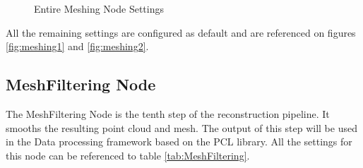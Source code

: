 \documentclass[12pt]{report}
\begin{document}
\begin{figure}[H]
  \centering
  \qquad
  \caption{Entire Meshing Node Settings}
  \label{fig:Meshingnodesettings}
\end{figure}

All the remaining settings are configured as default and are referenced on figures \ref{fig:meshing1} and \ref{fig:meshing2}.
\enlargethispage{\baselineskip}




\subsection*{MeshFiltering Node}
The MeshFiltering Node is the tenth step of the reconstruction pipeline. It smooths the resulting point cloud and mesh.
The output of this step will be used in the Data processing framework based on the PCL library.
All the settings for this node can be referenced to table \ref{tab:MeshFiltering}.
\end{document}
